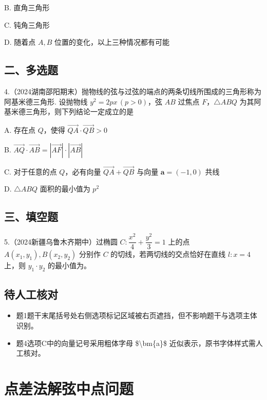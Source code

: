 \documentclass[UTF8,a4paper,11pt]{ctexart}
\begin{document}
B. 直角三角形

C. 钝角三角形

D. 随着点 $A,B$ 位置的变化，以上三种情况都有可能

\subsection*{二、多选题}

4.（2024湖南邵阳期末）抛物线的弦与过弦的端点的两条切线所围成的三角形称为阿基米德三角形. 设抛物线 $y^2=2px\,(p>0)$，弦 $AB$ 过焦点 $F$，$\triangle ABQ$ 为其阿基米德三角形，则下列结论一定成立的是

A. 存在点 $Q$，使得 $\overrightarrow{QA}\cdot\overrightarrow{QB}>0$

B. $\overrightarrow{AQ}\cdot\overrightarrow{AB}=|\overrightarrow{AF}|\cdot|\overrightarrow{AB}|$

C. 对于任意的点 $Q$，必有向量 $\overrightarrow{QA}+\overrightarrow{QB}$ 与向量 $\bm{a}=(-1,0)$ 共线

D. $\triangle ABQ$ 面积的最小值为 $p^2$

\subsection*{三、填空题}

5.（2024新疆乌鲁木齐期中）过椭圆 $C:\dfrac{x^2}{4}+\dfrac{y^2}{3}=1$ 上的点 $A(x_1,y_1),B(x_2,y_2)$ 分别作 $C$ 的切线，若两切线的交点恰好在直线 $l:x=4$ 上，则 $y_1\cdot y_2$ 的最小值为\underline{\hspace{3cm}}。

\subsection*{待人工核对}

\begin{itemize}

\item 题1题干末尾括号处右侧选项标记区域被右页遮挡，但不影响题干与选项主体识别。

\item 题4选项C中的向量记号采用粗体字母 \$\textbackslash{}bm\{a\}\$ 近似表示，原书字体样式需人工核对。

\end{itemize}

\clearpage

\section{点差法解弦中点问题}
\end{document}

